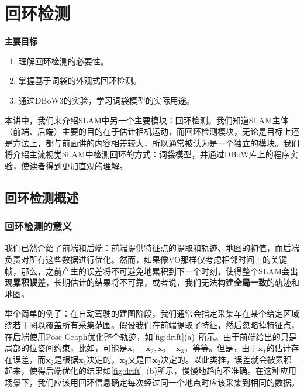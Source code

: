 \chapter{回环检测}
\begin{mdframed}  
	\textbf{主要目标}
	\begin{enumerate}[labelindent=0em,leftmargin=1.5em]
		\item 理解回环检测的必要性。
		\item 掌握基于词袋的外观式回环检测。
		\item 通过DBoW3的实验，学习词袋模型的实际用途。
	\end{enumerate}
\end{mdframed}

本讲中，我们来介绍SLAM中另一个主要模块：回环检测。我们知道SLAM主体（前端、后端）主要的目的在于估计相机运动，而回环检测模块，无论是目标上还是方法上，都与前面讲的内容相差较大，所以通常被认为是一个独立的模块。我们将介绍主流视觉SLAM中检测回环的方式：词袋模型，并通过DBoW库上的程序实验，使读者得到更加直观的理解。

\newpage


\newpage 

\section{回环检测概述}
\subsection{回环检测的意义}
我们已然介绍了前端和后端：前端提供特征点的提取和轨迹、地图的初值，而后端负责对所有这些数据进行优化。然而，如果像VO那样仅考虑相邻时间上的关键帧，那么，之前产生的误差将不可避免地累积到下一个时刻，使得整个SLAM会出现\textbf{累积误差}，长期估计的结果将不可靠，或者说，我们无法构建\textbf{全局一致}的轨迹和地图。

举个简单的例子：在自动驾驶的建图阶段，我们通常会指定采集车在某个给定区域绕若干圈以覆盖所有采集范围。假设我们在前端提取了特征，然后忽略掉特征点，在后端使用Pose Graph优化整个轨迹，如\autoref{fig:drift}(a)~所示。由于前端给出的只是局部的位姿间约束，比如，可能是$\bm{x}_1 - \bm{x}_2, \bm{x}_2-\bm{x}_3$，等等。但是，由于$\bm{x}_1$的估计存在误差，而$\bm{x}_2$是根据$\bm{x}_1$决定的，$\bm{x}_3$又是由$\bm{x}_2$决定的。以此类推，误差就会被累积起来，使得后端优化的结果如\autoref{fig:drift}~(b)所示，慢慢地趋向不准确。在这种应用场景下，我们应该用回环信息确定每次经过同一个地点时应该采集到相同的数据。

